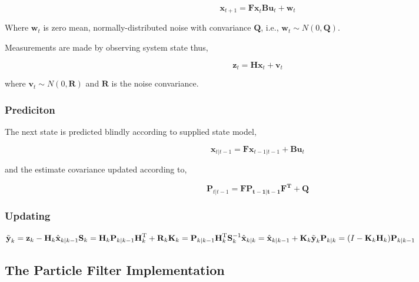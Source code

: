 \begin{equation}
\mathbf{x}_{t+1} = \mathbf{Fx}_{t} \mathbf{Bu}_{t} + \mathbf{w}_t
\end{equation}

Where $\mathbf{w}_t$ is zero mean, normally-distributed noise with convariance
$\mathbf{Q}$, i.e., $\mathbf{w}_{t} \sim N(0, \mathbf{Q})$.

Measurements are made by observing system state thus,

\begin{equation}
\mathbf{z}_{t} = \mathbf{Hx}_{t} + \mathbf{v}_t
\end{equation}

where $\mathbf{v}_{t} \sim N(0, \mathbf{R})$ and $\mathbf{R}$ is the
noise convariance.

\subsubsection{Prediciton}
The next state is predicted blindly according to supplied state model,

\begin{equation}
\mathbf{x}_{t|t-1} = \mathbf{Fx}_{t-1|t-1} + \mathbf{Bu}_{t}
\end{equation}

and the estimate covariance updated according to,

\begin{equation}
\mathbf{P}_{t|t-1} = \mathbf{FP_{t-1|t-1}F^{T}} + \mathbf{Q}
\end{equation}

\subsubsection{Updating}

\begin{math}
\tilde{\textbf{y}}_k = \textbf{z}_k - \textbf{H}_k\hat{\textbf{x}}_{k|k-1}\\
\textbf{S}_k = \textbf{H}_k \textbf{P}_{k|k-1} \textbf{H}_k^\text{T} + \textbf{R}_k\\
\textbf{K}_k = \textbf{P}_{k|k-1}\textbf{H}_k^\text{T}\textbf{S}_k^{-1}\\
\hat{\textbf{x}}_{k|k} = \hat{\textbf{x}}_{k|k-1} + \textbf{K}_k\tilde{\textbf{y}}_k\\
\textbf{P}_{k|k} = (I - \textbf{K}_k \textbf{H}_k) \textbf{P}_{k|k-1}
\end{math}

\subsection{The Particle Filter Implementation}

    
